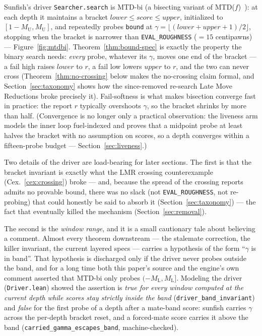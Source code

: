 \documentclass[11pt]{article}
\newcommand{\MU}{M_{\mathrm{U}}}    %
\newcommand{\ML}{M_{\mathrm{L}}}    %
\theoremstyle{plain}
\theoremstyle{definition}
\theoremstyle{remark}
\begin{document}
Sunfish's driver \texttt{Searcher.search} is MTD-bi (a bisecting variant
of MTD($f$)~\cite{plaat1996mtdf}): at each depth it maintains a bracket
$\mathit{lower} \le \mathit{score} \le \mathit{upper}$, initialized to
$[1-\MU, \MU]$, and repeatedly probes \texttt{bound} at
$\gamma = \lfloor(\mathit{lower}+\mathit{upper}+1)/2\rfloor$, stopping
when the bracket is narrower than \texttt{EVAL\_ROUGHNESS} ($=15$
centipawns) --- Figure~\ref{fig:mtdbi}.
Theorem~\ref{thm:bound-spec} is exactly the property the binary search
needs: \emph{every} probe, whatever its $\gamma$, moves one end of the
bracket --- a fail high raises $\mathit{lower}$ to $r$, a fail low
lowers $\mathit{upper}$ to $r$, and the two can never cross
(Theorem~\ref{thm:no-crossing} below makes the no-crossing claim
formal, and Section~\ref{sec:taxonomy} shows how the since-removed
re-search Late Move Reductions broke precisely it).  Fail-softness is
what makes bisection
converge fast in practice: the report $r$ typically overshoots
$\gamma$, so the bracket shrinks by more than half.  (Convergence is no
longer only a practical observation: the liveness arm models the inner
loop fuel-indexed and proves that a midpoint probe at least halves the
bracket with no assumption on scores, so a depth converges within a
fifteen-probe budget --- Section~\ref{sec:liveness}.)

Two details of the driver are load-bearing for later sections.  The
first is that the bracket invariant is exactly what the LMR crossing
counterexample (Cex.~\ref{cex:crossing}) broke --- and, because the
spread of the crossing reports admits no provable bound, there was no
slack (not \texttt{EVAL\_ROUGHNESS}, not re-probing) that could
honestly be said to absorb it (Section~\ref{sec:taxonomy}) --- the fact
that eventually killed the mechanism (Section~\ref{sec:removal}).

The second is the \emph{window range}, and it is a small cautionary
tale about believing a comment.  Almost every theorem downstream ---
the stalemate correction, the killer invariant, the current layered
specs --- carries a hypothesis of the form ``$\gamma$ is in band''.
That hypothesis is discharged only if the driver never probes outside
the band, and for a long time both this paper's source and the engine's
own comment asserted that MTD-bi only probes $(-\ML, \ML]$.  Modeling
the driver (\texttt{Driver.lean}) showed the assertion is
\emph{true for every window computed at the current depth while scores
stay strictly inside the band} (\texttt{driver\_band\_invariant}) and
\emph{false} for the first probe of a depth after a mate-band score:
sunfish carries $\gamma$ across the per-depth bracket reset, and a
forced-mate score carries it above the band
(\texttt{carried\_gamma\_escapes\_band}, machine-checked).
\end{document}
